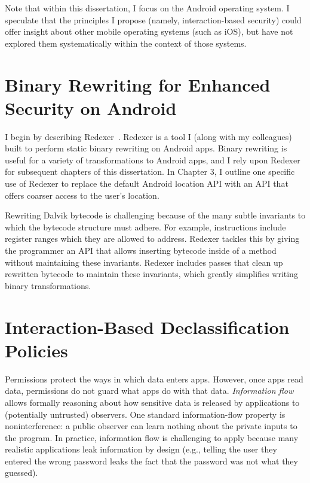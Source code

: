 Note that within this dissertation, I focus on the Android operating
system. I speculate that the principles I propose (namely,
interaction-based security) could offer insight about other mobile
operating systems (such as iOS), but have not explored them
systematically within the context of those systems.

\section{Binary Rewriting for Enhanced Security on Android}

I begin by describing
Redexer~\cite{jsjeon:spsm12,micinski:most13}. Redexer is a tool I
(along with my colleagues) built to perform static binary rewriting on
Android apps. Binary rewriting is useful for a variety of
transformations to Android apps, and I rely upon Redexer for
subsequent chapters of this dissertation. In Chapter 3, I outline one
specific use of Redexer to replace the default Android location API
with an API that offers coarser access to the user's location.

Rewriting Dalvik bytecode is challenging because of the many subtle
invariants to which the bytecode structure must adhere. For example,
instructions include register ranges which they are allowed to
address. Redexer tackles this by giving the programmer an API that
allows inserting bytecode inside of a method without maintaining these
invariants. Redexer includes passes that clean up rewritten bytecode
to maintain these invariants, which greatly simplifies writing binary
transformations.

\section{Interaction-Based Declassification Policies}

Permissions protect the ways in which data enters apps. However, once
apps read data, permissions do not guard what apps do with that
data. \emph{Information flow}~\cite{Denning:1975} allows formally
reasoning about how sensitive data is released by applications to
(potentially untrusted) observers. One standard information-flow
property is noninterference: a public observer can learn nothing about
the private inputs to the program. In practice, information flow is
challenging to apply because many realistic applications leak
information by design (e.g., telling the user they entered the wrong
password leaks the fact that the password was not what they guessed).

